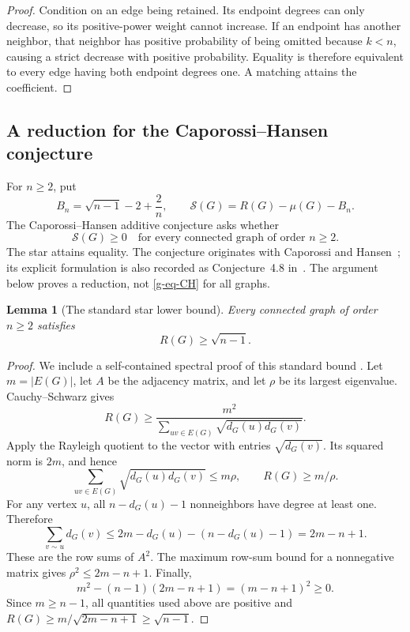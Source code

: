 \documentclass[11pt,a4paper]{article}
\newtheorem{lemma}[theorem]{Lemma}
\theoremstyle{definition}
\theoremstyle{remark}
\begin{document}
\begin{proof}
Condition on an edge being retained.  Its endpoint degrees can only
decrease, so its positive-power weight cannot increase.  If an endpoint
has another neighbor, that neighbor has positive probability of being
omitted because $k<n$, causing a strict decrease with positive
probability.  Equality is therefore equivalent to every edge having
both endpoint degrees one.  A matching attains the coefficient.
\end{proof}

\subsection{A reduction for the Caporossi--Hansen conjecture}
\label{g-sub-CH}

For $n\ge2$, put
\begin{equation}
 B_n=\sqrt{n-1}-2+\frac2n,\qquad
 \mathcal S(G)=R(G)-\mu(G)-B_n.
 \label{g-eq-CH-surplus}
\end{equation}
The Caporossi--Hansen additive conjecture asks whether
\begin{equation}
 \mathcal S(G)\ge0
 \quad\text{for every connected graph of order }n\ge2.
 \label{g-eq-CH}
\end{equation}
The star attains equality.  The conjecture originates with
Caporossi and Hansen~\cite{g-CH2000}; its explicit formulation is also
recorded as Conjecture~4.8 in~\cite{g-FMS2003}.  The argument below proves
a reduction, not \eqref{g-eq-CH} for all graphs.

\begin{lemma}[The standard star lower bound]
\label{g-lem-star-lower}
Every connected graph of order $n\ge2$ satisfies
\begin{equation}
 R(G)\ge\sqrt{n-1}.
 \label{g-eq-star-lower}
\end{equation}
\end{lemma}

\begin{proof}
We include a self-contained spectral proof of this standard bound
\cite{g-BE1998}.  Let $m=|E(G)|$, let $A$ be the adjacency matrix, and
let $\rho$ be its largest eigenvalue.  Cauchy--Schwarz gives
\[
 R(G)\ge
 \frac{m^2}{\sum_{uv\in E(G)}\sqrt{d_G(u)d_G(v)}}.
\]
Apply the Rayleigh quotient to the vector with entries $\sqrt{d_G(v)}$.
Its squared norm is $2m$, and hence
\[
 \sum_{uv\in E(G)}\sqrt{d_G(u)d_G(v)}\le m\rho,
 \qquad R(G)\ge m/\rho.
\]
For any vertex $u$, all $n-d_G(u)-1$ nonneighbors have degree at least
one.  Therefore
\[
 \sum_{v\sim u}d_G(v)\le2m-d_G(u)-(n-d_G(u)-1)=2m-n+1.
\]
These are the row sums of $A^2$.  The maximum row-sum bound for a
nonnegative matrix gives $\rho^2\le2m-n+1$.  Finally,
\[
 m^2-(n-1)(2m-n+1)=(m-n+1)^2\ge0.
\]
Since $m\ge n-1$, all quantities used above are positive and
$R(G)\ge m/\sqrt{2m-n+1}\ge\sqrt{n-1}$.
\end{proof}
\end{document}

